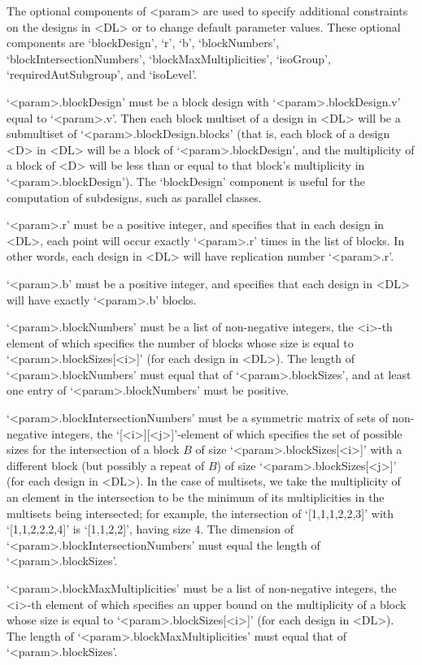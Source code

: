 The optional components of <param> are used to specify additional
constraints on the designs in <DL> or to change default parameter
values. These optional components are `blockDesign', `r', `b',
`blockNumbers', `blockIntersectionNumbers', `blockMaxMultiplicities',
`isoGroup', `requiredAutSubgroup', and `isoLevel'.

`<param>.blockDesign' must  be a block design with `<param>.blockDesign.v'
equal to `<param>.v'. Then each block multiset of a design in <DL> will
be a submultiset of `<param>.blockDesign.blocks' (that is, each block of
a design <D> in <DL> will be a block of `<param>.blockDesign', and the
multiplicity of a block of <D> will be less than or equal to that block's
multiplicity in `<param>.blockDesign'). The `blockDesign' component is
useful for the computation of subdesigns, such as parallel classes.

`<param>.r' must be a positive integer, and specifies that in each design
in <DL>, each point will occur exactly `<param>.r' times in the list of
blocks. In other words, each design in <DL> will have replication number
`<param>.r'.

`<param>.b' must be a positive integer, and specifies that each design
in <DL> will have exactly `<param>.b' blocks.

`<param>.blockNumbers' must be a list of non-negative integers, the <i>-th
element of which specifies the number of blocks whose size is equal
to `<param>.blockSizes[<i>]' (for each design in <DL>). The length of
`<param>.blockNumbers' must equal that of `<param>.blockSizes', and at
least one entry of `<param>.blockNumbers' must be positive.

`<param>.blockIntersectionNumbers' must be a symmetric matrix of sets
of non-negative integers, the `[<i>][<j>]'-element of which specifies
the set of possible sizes for the intersection of a block $B$ of
size `<param>.blockSizes[<i>]' with a different block (but possibly
a repeat of $B$) of size `<param>.blockSizes[<j>]' (for each design
in <DL>). In the case of multisets, we take the multiplicity of an
element in the intersection to be the minimum of its multiplicities in
the multisets being intersected; for example, the intersection of
`[1,1,1,2,2,3]' with `[1,1,2,2,2,4]' is `[1,1,2,2]', having size 4. The
dimension of `<param>.blockIntersectionNumbers' must equal the length of
`<param>.blockSizes'.

`<param>.blockMaxMultiplicities' must be a list of non-negative integers,
the <i>-th element of which specifies an upper bound on the multiplicity
of a block whose size is equal to `<param>.blockSizes[<i>]' (for each
design in <DL>). The length of `<param>.blockMaxMultiplicities' must
equal that of `<param>.blockSizes'.

